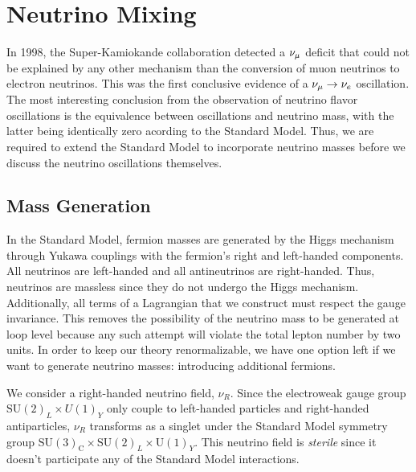 % 
% 

\section{Neutrino Mixing}\label{ch:oscillation}
In 1998, the Super-Kamiokande collaboration detected a $\nu_\mu$ deficit that could not be explained by any other mechanism
than the conversion of muon neutrinos to electron neutrinos. This was the first conclusive evidence of a $\nu_\mu \to \nu_e$ oscillation.
The most interesting conclusion from the observation of neutrino flavor oscillations is the equivalence between oscillations and neutrino mass, 
with the latter being identically zero acording to the Standard Model. Thus, we are required to extend the Standard Model to incorporate neutrino 
masses before we discuss the neutrino oscillations themselves.

\subsection{Mass Generation}
In the Standard Model, fermion masses are generated by the Higgs mechanism through Yukawa couplings with the fermion's right and left-handed components.
All neutrinos are left-handed and all antineutrinos are right-handed. Thus, neutrinos are massless since they do not undergo the Higgs mechanism.
Additionally, all terms of a Lagrangian that we construct must respect the gauge invariance. This removes the possibility of the neutrino mass to be 
generated at loop level because any such attempt will violate the total lepton number by two units.
In order to keep our theory renormalizable, we have one option left if we want to generate neutrino masses: introducing additional fermions. 

We consider a right-handed neutrino field, $\nu_R$. Since the electroweak gauge group $\text{SU}(2)_L \times U(1)_Y$ only couple to 
left-handed particles and right-handed antiparticles, $\nu_R$ transforms as a singlet under the Standard Model symmetry 
group $\mathrm{SU}(3)_{\mathrm{C}} \times \mathrm{SU}(2)_{L} \times \mathrm{U}(1)_{Y}$. 
This neutrino field is \emph{sterile} since it doesn't participate any of the Standard Model interactions. 

